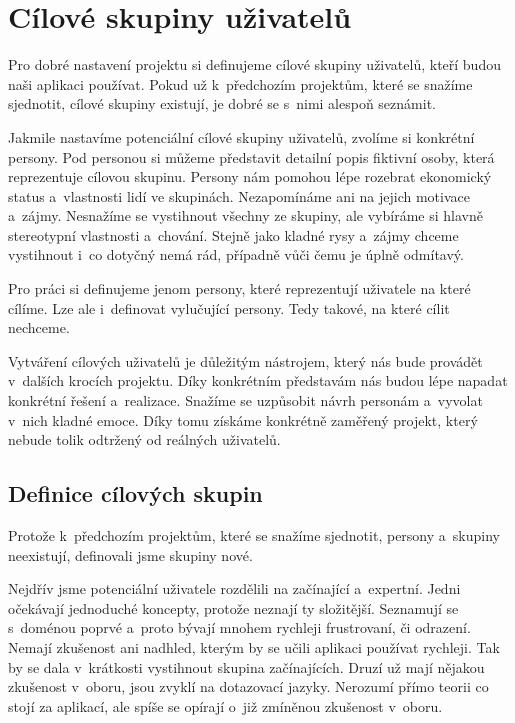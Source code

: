 \chapter{Cílové skupiny uživatelů}

Pro dobré nastavení projektu si definujeme cílové skupiny uživatelů, kteří budou naši aplikaci používat. Pokud už k~předchozím projektům, které se snažíme sjednotit, cílové skupiny existují, je dobré se s~nimi alespoň seznámit.

Jakmile nastavíme potenciální cílové skupiny uživatelů, zvolíme si konkrétní persony. Pod personou si můžeme představit detailní popis fiktivní osoby, která reprezentuje cílovou skupinu. Persony nám pomohou lépe rozebrat ekonomický status a~vlastnosti lidí ve skupinách. Nezapomínáme ani na jejich motivace a~zájmy. Nesnažíme se vystihnout všechny ze skupiny, ale vybíráme si hlavně stereotypní vlastnosti a~chování. Stejně jako kladné rysy a~zájmy chceme vystihnout i~co dotyčný nemá rád, případně vůči čemu je úplně odmítavý.


Pro práci si definujeme jenom persony, které reprezentují uživatele na které cílíme. Lze ale i~definovat vylučující persony. Tedy takové, na které cílit nechceme.

Vytváření cílových uživatelů je důležitým nástrojem, který nás bude provádět v~dalších krocích projektu. Díky konkrétním představám nás budou lépe napadat konkrétní řešení a~realizace. Snažíme se uzpůsobit návrh personám a~vyvolat v~nich kladné emoce. Díky tomu získáme konkrétně zaměřený projekt, který nebude tolik odtržený od reálných uživatelů.

\section{Definice cílových skupin}

Protože k~předchozím projektům, které se snažíme sjednotit, persony a~skupiny neexistují, definovali jsme skupiny nové.

Nejdřív jsme potenciální uživatele rozdělili na začínající a~expertní. Jedni očekávají jednoduché koncepty, protože neznají ty složitější. Seznamují se s~doménou poprvé a~proto bývají mnohem rychleji frustrovaní, či odrazení. Nemají zkušenost ani nadhled, kterým by se učili aplikaci používat rychleji. Tak by se dala v~krátkosti vystihnout skupina začínajících. Druzí už mají nějakou zkušenost v~oboru, jsou zvyklí na dotazovací jazyky. Nerozumí přímo teorii co stojí za aplikací, ale spíše se opírají o~již zmíněnou zkušenost v~oboru.

